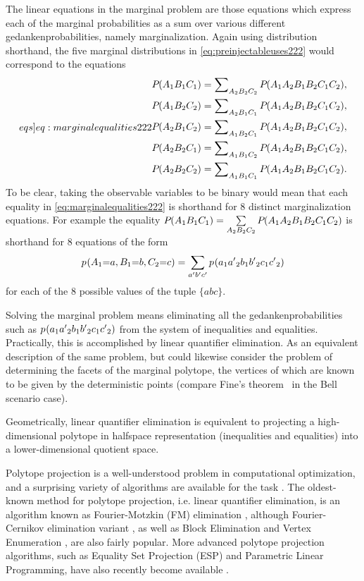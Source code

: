 The linear equations in the marginal problem are those equations which express each of the marginal probabilities as a sum over various different gedankenprobabilities, namely marginalization. Again using distribution shorthand, the five marginal distributions in \cref{eq:preinjectableuses222} would correspond to the equations
\begin{align}\label[eqs]{eq:marginalequalities222}
\begin{split}
&\pdf{A_1 B_1 C_1} = \sum\nolimits_{A_2 B_2 C_2}\pdf{A_1 A_2 B_1 B_2 C_1 C_2},\\
&\pdf{A_1 B_2 C_2} = \sum\nolimits_{A_2 B_1 C_1}\pdf{A_1 A_2 B_1 B_2 C_1 C_2},\\
&\pdf{A_2 B_1 C_2} = \sum\nolimits_{A_1 B_2 C_1}\pdf{A_1 A_2 B_1 B_2 C_1 C_2},\\
&\pdf{A_2 B_2 C_1} = \sum\nolimits_{A_1 B_1 C_2}\pdf{A_1 A_2 B_1 B_2 C_1 C_2},\\
&\pdf{A_2 B_2 C_2} = \sum\nolimits_{A_1 B_1 C_1}\pdf{A_1 A_2 B_1 B_2 C_1 C_2}.
\end{split}
\end{align}
To be clear, taking the observable variables to be binary would mean that each equality in \cref{eq:marginalequalities222} is shorthand for 8 distinct marginalization equations. For example the equality ${P_{}}\lparen A_1 B_1 C_1\rparen = \sum\limits_{A_2 B_2 C_2}{P_{}}\lparen A_1 A_2 B_1 B_2 C_1 C_2\rparen$ is shorthand for 8 equations of the form
\begin{align}
{p_{}}\lparen A_1\mathord{=} a,  B_1\mathord{=} b, C_2\mathord{=} c\rparen = \sum\limits_{a' b' c'}{p_{}}\lparen a_1 {a'}_2 {b}_1 {b'}_2 {c}_1 {c'}_2\rparen
\end{align}
for each of the 8 possible values of the tuple $\{a b c\}$.

Solving the marginal problem means eliminating all the gedankenprobabilities such as ${p_{}}\lparen a_1 {a'}_2 {b}_1 {b'}_2 {c}_1 {c'}_2\rparen$ from the system of inequalities and equalities. Practically, this is accomplished by linear quantifier elimination. As an equivalent description of the same problem, but could likewise consider the problem of determining the facets of the marginal polytope, the vertices of which are known to be given by the deterministic points (compare Fine's theorem~\cite{FineTheorem} in the Bell scenario case).

Geometrically, linear quantifier elimination is equivalent to projecting a high-dimensional polytope in halfspace representation (inequalities and equalities) into a lower-dimensional quotient space.

Polytope projection is a well-understood problem in computational optimization, and a surprising variety of algorithms are available for the task \cite{jones2004equality,JonesThesis2005,Jones2008}. The oldest-known method for polytope projection, i.e. linear quantifier elimination, is an algorithm known as Fourier-Motzkin (FM) elimination \cite{fordan1999projection,DantzigEaves}, although Fourier-Cernikov elimination variant \cite{Shapot2012,Bastrakov2015}, as well as Block Elimination and Vertex Enumeration \cite{Avis2000lrs}, are also fairly popular. More advanced polytope projection algorithms, such as Equality Set Projection (ESP) and Parametric Linear Programming, have also recently become available \cite{jones2004equality,JonesThesis2005,Jones2008}. 

